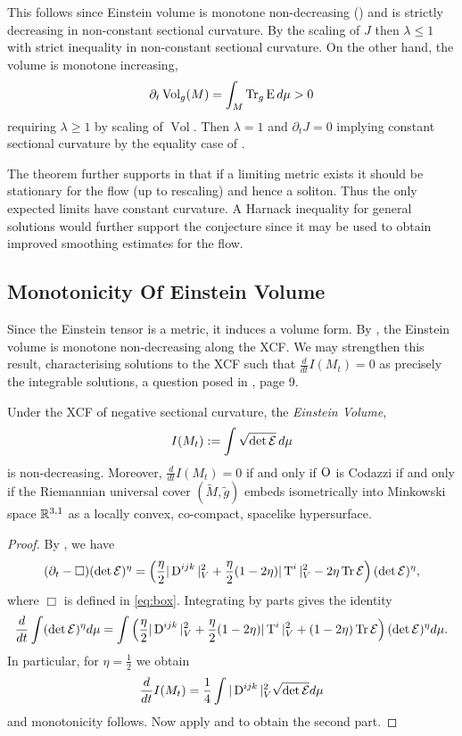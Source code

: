 \documentclass[a4paper,12pt]{amsart}
\begin{document}
 This follows since Einstein volume is monotone non-decreasing () and is strictly decreasing in non-constant sectional curvature. By the scaling of \(J\) then \(\lambda \leq 1\) with strict inequality in non-constant sectional curvature. On the other hand, the volume is monotone increasing,
\[
\partial_t \operatorname{Vol}_g (M) = \int_M \operatorname{Tr}_g \operatorname{E} d\mu > 0
\]
requiring \(\lambda \geq 1\) by scaling of \(\operatorname{Vol}\). Then \(\lambda = 1\) and \(\partial_t J = 0\) implying constant sectional curvature by the equality case of .

The theorem further supports  in that if a limiting metric exists it should be stationary for the flow (up to rescaling) and hence a soliton. Thus the only expected limits have constant curvature. A Harnack inequality for general solutions would further support the conjecture since it may be used to obtain improved smoothing estimates for the flow.

\subsection{Monotonicity Of Einstein Volume}
\label{subsec:xcf_volume}

Since the Einstein tensor is a metric, it induces a volume form. By \cite[Proposition 9]{MR2055396}, the Einstein volume is monotone non-decreasing along the XCF. We may strengthen this result, characterising solutions to the XCF such that \(\frac{d}{dt} I(M_t) = 0\) as precisely the integrable solutions, a question posed in \cite{MR2055396}, page 9.

\begin{thm}
\label{thm:volume_monotonicity}
Under the XCF of negative sectional curvature, the \emph{Einstein Volume},
\[
I(M_t):=\int \sqrt{\det\operatorname{\mathcal{E}}}\,d\mu
\]
is non-decreasing. Moreover, \(\frac{d}{dt} I(M_t)= 0\) if and only if \(\operatorname{O}\) is Codazzi if and only if the Riemannian universal cover \((\tilde{M}, \tilde{g})\) embeds isometrically into Minkowski space \(\mathbb{R}^{3,1}\) as a locally convex, co-compact, spacelike hypersurface.
\end{thm}

\begin{proof}
By \cite[Proposition 9]{MR2055396}, we have
\[
(\partial_t - \Box) (\det\operatorname{\mathcal{E}})^\eta = \left(\frac{\eta}{2}|\operatorname{D}^{ijk}|_V^2 + \frac{\eta}{2}(1-2\eta)|\operatorname{T}^i|^2_V - 2\eta\operatorname{Tr}\operatorname{\mathcal{E}}\right)(\det\operatorname{\mathcal{E}})^\eta,
\]
where \(\Box\) is defined in \eqref{eq:box}. Integrating by parts gives the identity
\[
\frac{d}{dt}\int(\det\operatorname{\mathcal{E}})^\eta d\mu = \int \left(\frac{\eta}{2}|\operatorname{D}^{ijk}|_V^2 + \frac{\eta}{2}(1-2\eta)|\operatorname{T}^i|^2_V + (1-2\eta)\operatorname{Tr}\operatorname{\mathcal{E}}\right)(\det\operatorname{\mathcal{E}})^\eta d\mu.
\]
In particular, for $\eta=\frac{1}{2}$ we obtain
\[
\frac{d}{dt}I(M_t) = \frac{1}{4}\int |\operatorname{D}^{ijk}|_V^2\sqrt{\det\operatorname{\mathcal{E}}}d\mu
\]
and monotonicity follows. Now apply  and  to obtain the second part.
\end{proof}
\end{document}
